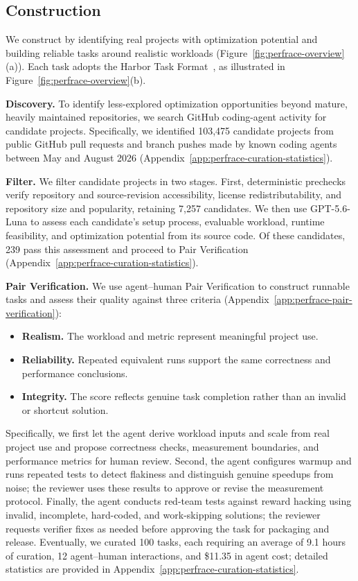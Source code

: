 \subsection{Construction}
\label{sec:perfrace-construction}

We construct \perfrace{} by identifying real projects with optimization potential
and building reliable tasks around realistic workloads (Figure~\ref{fig:perfrace-overview}(a)).
Each \perfrace{} task adopts the Harbor Task Format~\citep{merrill2026terminalbench}, as illustrated in Figure~\ref{fig:perfrace-overview}(b).

\textbf{Discovery.} To identify less-explored optimization opportunities beyond mature, heavily maintained repositories, we search GitHub coding-agent activity for candidate projects. Specifically, we identified 103,475 candidate projects from public GitHub pull requests and branch pushes made by known coding agents between May and August 2026 (Appendix~\ref{app:perfrace-curation-statistics}).

\textbf{Filter.} We filter candidate projects in two stages. First, deterministic prechecks verify repository and source-revision accessibility, license redistributability, and repository size and popularity, retaining 7,257 candidates. We then use GPT-5.6-Luna to assess each candidate's setup process, evaluable workload, runtime feasibility, and optimization potential from its source code. Of these candidates, 239 pass this assessment and proceed to Pair Verification (Appendix~\ref{app:perfrace-curation-statistics}).

\textbf{Pair Verification.}
We use agent--human Pair Verification to construct runnable tasks and assess their quality against three criteria (Appendix~\ref{app:perfrace-pair-verification}):
\begin{itemize}
  \item \textbf{Realism.} The workload and metric represent meaningful project use.
  \item \textbf{Reliability.} Repeated equivalent runs support the same correctness and
  performance conclusions.
  \item \textbf{Integrity.} The score reflects genuine task completion rather than an
  invalid or shortcut solution.
\end{itemize}

Specifically, we first let the agent derive workload inputs and scale from real project use and propose correctness checks, measurement boundaries, and performance metrics for human review.
Second, the agent configures warmup and runs repeated tests to detect flakiness and distinguish genuine speedups from noise; the reviewer uses these results to approve or revise the measurement protocol.
Finally, the agent conducts red-team tests against reward hacking using invalid, incomplete, hard-coded, and work-skipping solutions; the reviewer requests verifier fixes as needed before approving the task for packaging and release.
Eventually, we curated 100 tasks, each requiring an average of 9.1 hours of
curation, 12 agent--human interactions, and \$11.35 in agent cost; detailed
statistics are provided in Appendix~\ref{app:perfrace-curation-statistics}.

